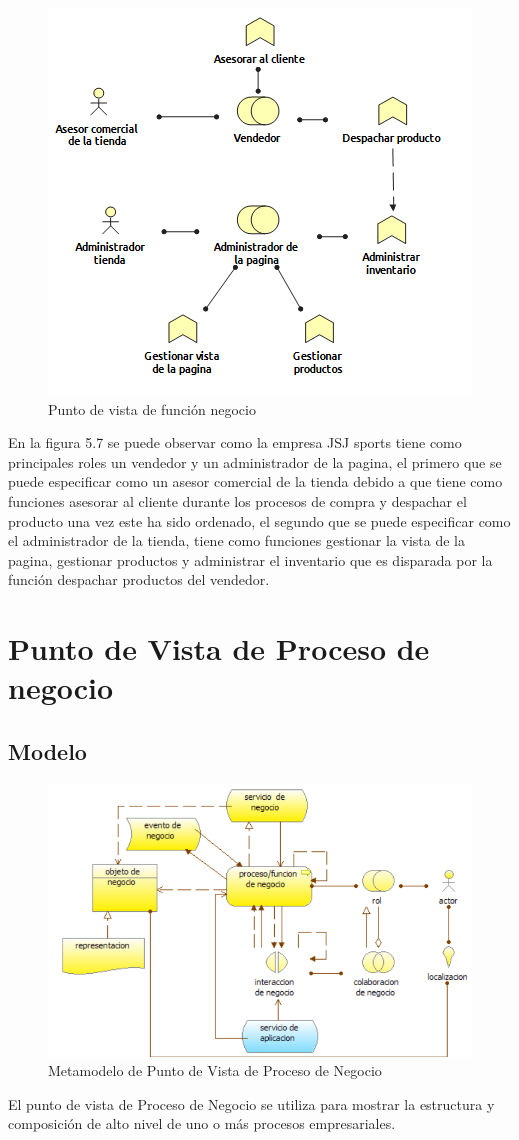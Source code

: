 \begin{figure}[th!]
	\centering
	\includegraphics[width=0.6\linewidth]{arquitectura/imagenes/vistaNegocio}
	\caption{Punto de vista de función negocio}
	\label{fig:Punto de vista de funcion de negocio}
\end{figure}

En la figura 5.7 se puede observar como la empresa JSJ sports tiene como principales roles un vendedor y un administrador de la pagina, el primero que se puede especificar como un asesor comercial de la tienda debido a que tiene como funciones asesorar al cliente durante los procesos de compra y despachar el producto una vez este ha sido ordenado, el segundo que se puede especificar como el administrador de la tienda, tiene como funciones gestionar la vista de la pagina, gestionar productos y administrar el inventario que es disparada por la función despachar productos del vendedor. 



\newpage

\section{Punto de Vista de Proceso de negocio}

\subsection{Modelo}
\begin{figure}[th!]
	\centering
	\includegraphics[width=0.6\linewidth]{arquitectura/imagenes/modeloProcesoNegocio}
	\caption{Metamodelo de Punto de Vista de Proceso de Negocio \cite{pun4}}
	\label{fig:metamodelo de punto de vista de proceso de negocio}
\end{figure} 
El punto de vista de Proceso de Negocio se utiliza para mostrar la estructura y composición de alto nivel de uno o más procesos empresariales. 


